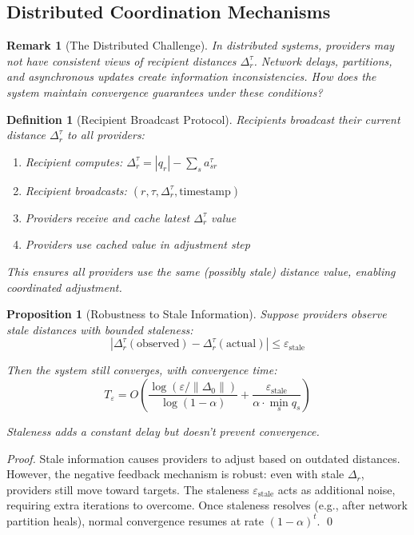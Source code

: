 \documentclass[11pt]{article}
\newtheorem{definition}{Definition}
\newtheorem{proposition}{Proposition}
\newtheorem{remark}{Remark}
\begin{document}
\subsection{Distributed Coordination Mechanisms}

\begin{remark}[The Distributed Challenge]
In distributed systems, providers may not have consistent views of recipient distances $\Delta_r^\tau$. Network delays, partitions, and asynchronous updates create information inconsistencies. How does the system maintain convergence guarantees under these conditions?
\end{remark}

\begin{definition}[Recipient Broadcast Protocol]
Recipients broadcast their current distance $\Delta_r^\tau$ to all providers:
\begin{enumerate}
\item Recipient computes: $\Delta_r^\tau = |q_r| - \sum_s a_{sr}^\tau$
\item Recipient broadcasts: $(r, \tau, \Delta_r^\tau, \text{timestamp})$
\item Providers receive and cache latest $\Delta_r^\tau$ value
\item Providers use cached value in adjustment step
\end{enumerate}

This ensures all providers use the same (possibly stale) distance value, enabling coordinated adjustment.
\end{definition}

\begin{proposition}[Robustness to Stale Information]
\label{prop:stale-robustness}
Suppose providers observe stale distances with bounded staleness:
\[
|\Delta_r^\tau(\text{observed}) - \Delta_r^\tau(\text{actual})| \leq \varepsilon_{\text{stale}}
\]

Then the system still converges, with convergence time:
\[
T_\varepsilon = O\left(\frac{\log(\varepsilon / \|\Delta_0\|)}{\log(1-\alpha)} + \frac{\varepsilon_{\text{stale}}}{\alpha \cdot \min_s q_s}\right)
\]

Staleness adds a constant delay but doesn't prevent convergence.
\end{proposition}

\begin{proof}
Stale information causes providers to adjust based on outdated distances. However, the negative feedback mechanism is robust: even with stale $\Delta_r$, providers still move toward targets. The staleness $\varepsilon_{\text{stale}}$ acts as additional noise, requiring extra iterations to overcome. Once staleness resolves (e.g., after network partition heals), normal convergence resumes at rate $(1-\alpha)^t$. \qed
\end{proof}
\end{document}

